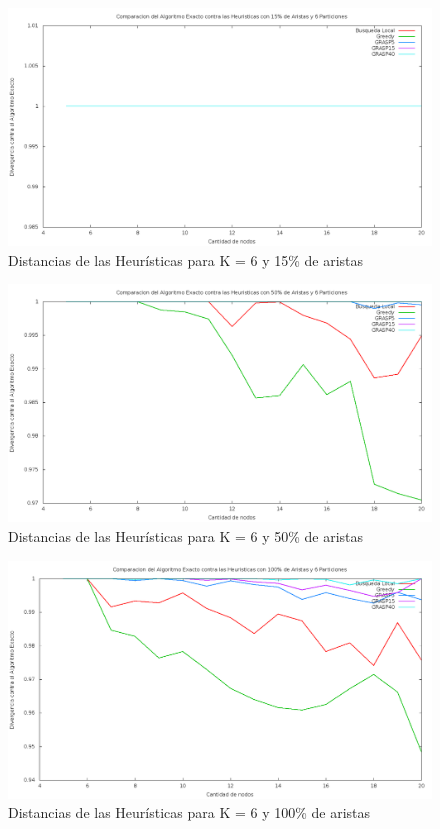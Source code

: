 \begin{figure}[H]
\begin{center}
\includegraphics[scale=0.3]{finales/ComparacionesCon6Particiones15Aristas.png}
\caption{Distancias de las Heur\'isticas para K = 6 y 15\% de aristas}
\end{center}
\end{figure}

\begin{figure}[H]
\begin{center}
\includegraphics[scale=0.3]{finales/ComparacionesCon6Particiones50Aristas.png}
\caption{Distancias de las Heur\'isticas para K = 6 y 50\% de aristas}
\end{center}
\end{figure}

\begin{figure}[H]
\begin{center}
\includegraphics[scale=0.3]{finales/ComparacionesCon6Particiones100Aristas.png}
\caption{Distancias de las Heur\'isticas para K = 6 y 100\% de aristas}
\end{center}
\end{figure}

